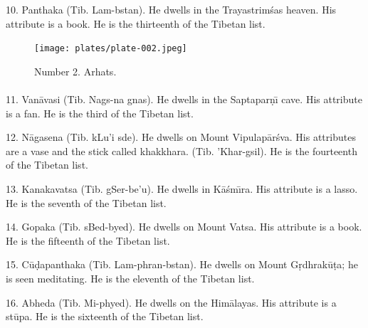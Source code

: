 \documentclass[a4paper, 12pt, oneside]{article}
\begin{document}
10. Panthaka (Tib. Lam-bstan). He dwells in the Trayastrim\'{s}as heaven. His attribute is a book. He is the thirteenth of the Tibetan list.

\clearpage
\vspace*{\fill}
\begin{figure}[H]
\centering
\texttt{[image: plates/plate-002.jpeg]}
\caption*{Number 2. Arhats.}
\end{figure}
\vspace*{\fill}
\clearpage
\paragraph{}
11. Van\={a}vasi (Tib. Nags-na gnas). He dwells in the Saptapar\d{n}\={\i} cave. His attribute is a fan. He is the third of the Tibetan list.

12. N\={a}gasena (Tib. kLu'i sde). He dwells on Mount Vipulap\={a}r\'{s}va. His attributes are a vase and the stick called khakkhara. (Tib. 'Khar-gsil). He is the fourteenth of the Tibetan list.

13. Kanakavatsa (Tib. gSer-be'u). He dwells in K\={a}\'{s}m\={\i}ra. His attribute is a lasso. He is the seventh of the Tibetan list.

14. Gopaka (Tib. sBed-byed). He dwells on Mount Vatsa. His attribute is a book. He is the fifteenth of the Tibetan list.

15. C\={u}\d{d}apanthaka (Tib. Lam-phran-bstan). He dwells on Mount G\d{r}dhrak\={u}\d{t}a; he is seen meditating. He is the eleventh of the Tibetan list.

16. Abheda (Tib. Mi-phyed). He dwells on the Him\={a}layas. His attribute is a st\={u}pa. He is the sixteenth of the Tibetan list.
\end{document}
